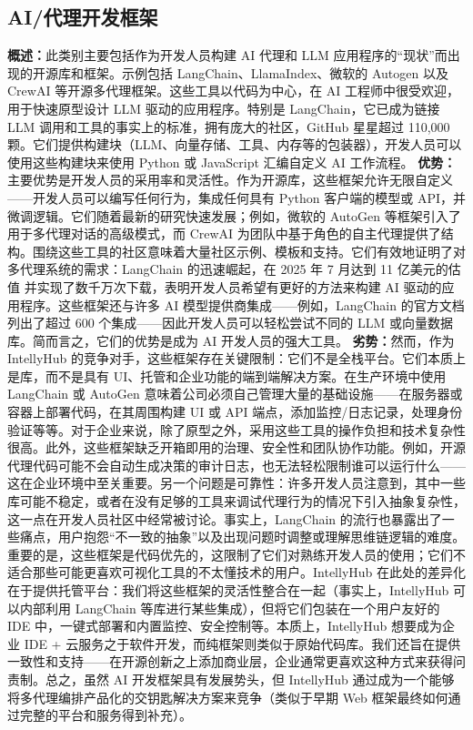\documentclass[11点, A4纸, 单面]{article}
\begin{document}
\subsection{AI/代理开发框架}

\textbf{概述：}此类别主要包括作为开发人员构建 AI 代理和 LLM 应用程序的“现状”而出现的开源库和框架。示例包括 LangChain、LlamaIndex、微软的 Autogen 以及 CrewAI 等开源多代理框架。这些工具以代码为中心，在 AI 工程师中很受欢迎，用于快速原型设计 LLM 驱动的应用程序。特别是 LangChain，它已成为链接 LLM 调用和工具的事实上的标准，拥有庞大的社区，GitHub 星星超过 110,000 颗\cite{langchainGitHub}。它们提供构建块（LLM、向量存储、工具、内存等的包装器），开发人员可以使用这些构建块来使用 Python 或 JavaScript 汇编自定义 AI 工作流程。
\newline\newline
\textbf{优势：}主要优势是开发人员的采用率和灵活性。作为开源库，这些框架允许无限自定义——开发人员可以编写任何行为，集成任何具有 Python 客户端的模型或 API，并微调逻辑。它们随着最新的研究快速发展；例如，微软的 AutoGen 等框架引入了用于多代理对话的高级模式\cite{autogenGitHub}，而 CrewAI 为团队中基于角色的自主代理提供了结构\cite{crewaiGitHub}。围绕这些工具的社区意味着大量社区示例、模板和支持。它们有效地证明了对多代理系统的需求：LangChain 的迅速崛起，在 2025 年 7 月达到 11 亿美元的估值\cite{langchainValuation} 并实现了数千万次下载，表明开发人员希望有更好的方法来构建 AI 驱动的应用程序。这些框架还与许多 AI 模型提供商集成——例如，LangChain 的官方文档列出了超过 600 个集成\cite{langchainIntegrations}——因此开发人员可以轻松尝试不同的 LLM 或向量数据库。简而言之，它们的优势是成为 AI 开发人员的强大工具。
\newline\newline
\textbf{劣势：}然而，作为 IntellyHub 的竞争对手，这些框架存在关键限制：它们不是全栈平台。它们本质上是库，而不是具有 UI、托管和企业功能的端到端解决方案。在生产环境中使用 LangChain 或 AutoGen 意味着公司必须自己管理大量的基础设施——在服务器或容器上部署代码，在其周围构建 UI 或 API 端点，添加监控/日志记录，处理身份验证等等。对于企业来说，除了原型之外，采用这些工具的操作负担和技术复杂性很高。此外，这些框架缺乏开箱即用的治理、安全性和团队协作功能。例如，开源代理代码可能不会自动生成决策的审计日志，也无法轻松限制谁可以运行什么——这在企业环境中至关重要。另一个问题是可靠性：许多开发人员注意到，其中一些库可能不稳定，或者在没有足够的工具来调试代理行为的情况下引入抽象复杂性，这一点在开发人员社区中经常被讨论\cite{langchainCritique}。事实上，LangChain 的流行也暴露出了一些痛点，用户抱怨“不一致的抽象”以及出现问题时调整或理解思维链逻辑的难度。重要的是，这些框架是代码优先的，这限制了它们对熟练开发人员的使用；它们不适合那些可能更喜欢可视化工具的不太懂技术的用户。IntellyHub 在此处的差异化在于提供托管平台：我们将这些框架的灵活性整合在一起（事实上，IntellyHub 可以内部利用 LangChain 等库进行某些集成），但将它们包装在一个用户友好的 IDE 中，一键式部署和内置监控、安全控制等。本质上，IntellyHub 想要成为企业 IDE + 云服务之于软件开发，而纯框架则类似于原始代码库。我们还旨在提供一致性和支持——在开源创新之上添加商业层，企业通常更喜欢这种方式来获得问责制。总之，虽然 AI 开发框架具有发展势头，但 IntellyHub 通过成为一个能够将多代理编排产品化的交钥匙解决方案来竞争（类似于早期 Web 框架最终如何通过完整的平台和服务得到补充）。
\end{document}
